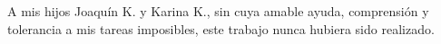 
\begin{acknowledgements}

A mis hijos Joaquín K. y Karina K., sin cuya amable ayuda, comprensión y tolerancia a mis tareas imposibles, este trabajo nunca hubiera sido realizado.\\


\end{acknowledgements}




